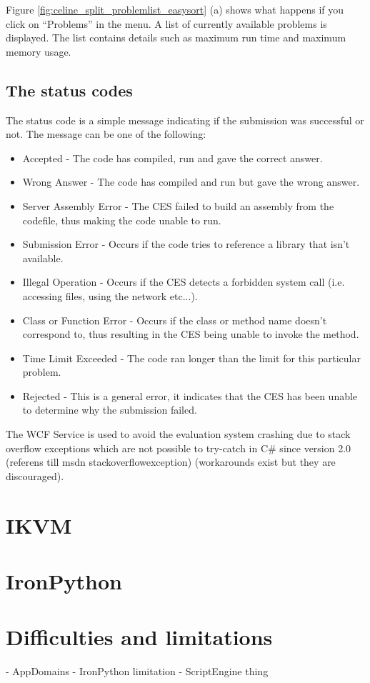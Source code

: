 Figure \ref{fig:celine_split_problemlist_easysort} (a) shows what happens if you click on ``Problems'' in the menu. A list of currently available problems is displayed. The list contains details such as maximum run time and maximum memory usage. 


\subsection{The status codes}
The status code is a simple message indicating if the submission was successful or not. The message can be one of the following:
\begin{itemize}
	\item Accepted - The code has compiled, run and gave the correct answer.
	\item Wrong Answer - The code has compiled and run but gave the wrong answer.
	\item Server Assembly Error - The CES failed to build an assembly from the codefile, thus making the code unable to run.
	\item Submission Error - Occurs if the code tries to reference a library that isn't available. 
	\item Illegal Operation - Occurs if the CES detects a forbidden system call (i.e. accessing files, using the network etc...).
	\item Class or Function Error - Occurs if the class or method name doesn't correspond to, thus resulting in the CES being unable to invoke the method.
	\item Time Limit Exceeded - The code ran longer than the limit for this particular problem.
	\item Rejected - This is a general error, it indicates that the CES has been unable to determine why the submission failed. 
\end{itemize}

The WCF Service is used to avoid the evaluation system crashing due to stack overflow exceptions which are not possible to try-catch in C\# since version 2.0 (referens  till msdn stackoverflowexception) (workarounds exist but they are discouraged).


\section{IKVM}

\section{IronPython}

\section{Difficulties and limitations}
- AppDomains
- IronPython limitation
- ScriptEngine thing
